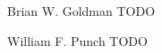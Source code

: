 \documentclass[journal]{IEEEtran}
\begin{document}




% 

\begin{IEEEbiography}{Brian W. Goldman}
TODO
\end{IEEEbiography}

\begin{IEEEbiographynophoto}{William F. Punch}
TODO
\end{IEEEbiographynophoto}







\end{document}
